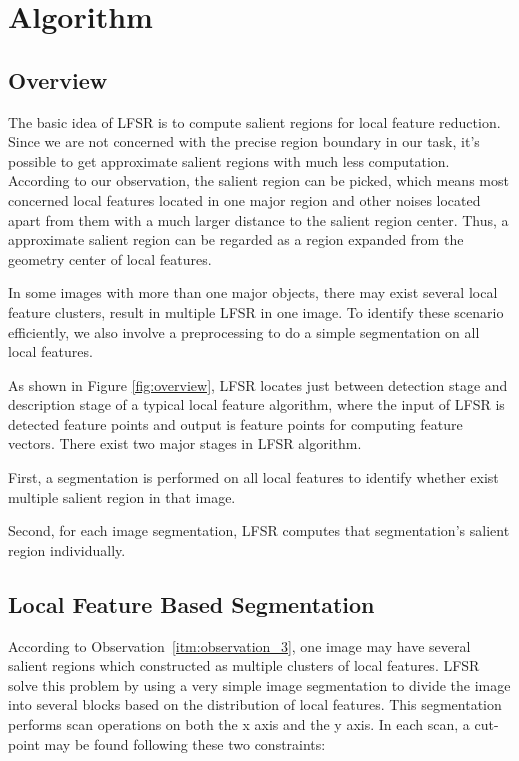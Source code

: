 \section{Algorithm}
\label{sec:algorithm}

\subsection{Overview}
\label{sec:algorithm_overview}

The basic idea of LFSR is to compute salient regions for local feature reduction. Since we are not concerned with the precise region boundary in our task, it's possible to get approximate salient regions with much less computation. According to our observation, the salient region can be picked, which means most concerned local features located in one major region and other noises located apart from them with a much larger distance to the salient region center. Thus, a approximate salient region can be regarded as a region expanded from the geometry center of local features. 

In some images with more than one major objects, there may exist several local feature clusters, result in multiple LFSR in one image. To identify these scenario efficiently, we also involve a preprocessing to do a simple segmentation on all local features. 

As shown in Figure \ref{fig:overview}, LFSR locates just between detection stage and description stage of a typical local feature algorithm, where the input of LFSR is detected feature points and output is feature points for computing feature vectors. There exist two major stages in LFSR algorithm.
\begin{inparaenum}
\item First, a segmentation is performed on all local features to identify whether exist multiple salient region in that image. 
\item Second, for each image segmentation, LFSR computes that segmentation's salient region individually.
\end{inparaenum}

\subsection{Local Feature Based Segmentation}
\label{sec:algorithm_segmentation}

According to Observation~\ref{itm:observation_3}, one image may have several salient regions which constructed as multiple clusters of local features. LFSR solve this problem by using a very simple image segmentation to divide the image into several blocks based on the distribution of local features. This segmentation performs scan operations on both the x axis and the y axis. In each scan, a cut-point may be found following these two constraints:

